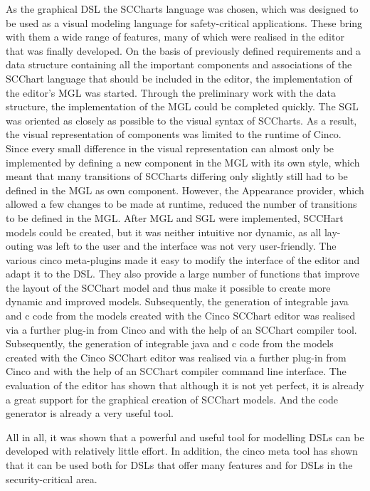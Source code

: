 As the graphical DSL the SCCharts language was chosen, which was designed to be used as a visual modeling language for safety-critical applications. These bring with them a wide range of features, many of which were realised in the editor that was finally developed. On the basis of previously defined requirements and a data structure containing all the important components and associations of the SCChart language that should be included in the editor, the implementation of the editor's MGL was started. Through the preliminary work with the data structure, the implementation of the MGL could be completed quickly. The SGL was oriented as closely as possible to the visual syntax of SCCharts. As a result, the visual representation of components was limited to the runtime of Cinco. Since every small difference in the visual representation can almost only be implemented by defining a new component in the MGL with its own style, which meant that many transitions of SCCharts differing only slightly still had to be defined in the MGL as own component. However, the Appearance provider, which allowed a few changes to be made at runtime, reduced the number of transitions to be defined in the MGL. After MGL and SGL were implemented, SCCHart models could be created, but it was neither intuitive nor dynamic, as all lay-outing was left to the user and the interface was not very user-friendly. The various cinco meta-plugins made it easy to modify the interface of the editor and adapt it to the DSL. They also provide a large number of functions that improve the layout of the SCChart model and thus make it possible to create more dynamic and improved models. Subsequently, the generation of integrable java and c code from the models created with the Cinco SCChart editor was realised via a further plug-in from Cinco and with the help of an SCChart compiler tool. Subsequently, the generation of integrable java and c code from the models created with the Cinco SCChart editor was realised via a further plug-in from Cinco and with the help of an SCChart compiler command line interface. The evaluation of the editor has shown that although it is not yet perfect, it is already a great support for the graphical creation of SCChart models. And the code generator is already a very useful tool. 

All in all, it was shown that a powerful and useful tool for modelling DSLs can be developed with relatively little effort. In addition, the cinco meta tool has shown that it can be used both for DSLs that offer many features and for DSLs in the security-critical area.